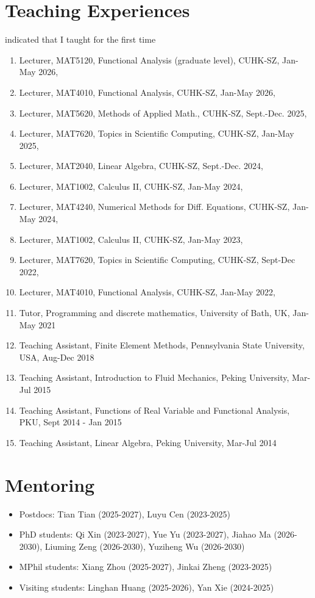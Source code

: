 \documentclass[letterpaper]{article}
\begin{document}
\section*{Teaching Experiences}
\hfill {\bf *} indicated that I taught for the first time
\begin{enumerate}[leftmargin=*]
\item {\bf *} Lecturer, MAT5120, Functional Analysis (graduate level),  CUHK-SZ, Jan-May 2026, 
\item Lecturer, MAT4010, Functional Analysis,  CUHK-SZ, Jan-May 2026, 
\item {\bf *} Lecturer, MAT5620, Methods of Applied Math., CUHK-SZ, Sept.-Dec. 2025,
\item  Lecturer, MAT7620, Topics in Scientific Computing, CUHK-SZ,  Jan-May 2025,
\item {\bf *} Lecturer, MAT2040, Linear Algebra, CUHK-SZ, Sept.-Dec. 2024,
\item Lecturer, MAT1002, Calculus II, CUHK-SZ, Jan-May 2024,
\item {\bf *} Lecturer, MAT4240, Numerical Methods for Diff. Equations, CUHK-SZ, Jan-May 2024,
\item {\bf *}  Lecturer, MAT1002, Calculus II, CUHK-SZ, Jan-May 2023, 

\item {\bf *} Lecturer, MAT7620, Topics in Scientific Computing,   CUHK-SZ, Sept-Dec 2022, 
\item {\bf *} Lecturer, MAT4010, Functional Analysis,  CUHK-SZ, Jan-May 2022, 
 
\item Tutor, Programming and discrete mathematics, University of Bath, UK, Jan-May 2021  
\item Teaching Assistant, Finite Element Methods, Pennsylvania State University, USA, Aug-Dec 2018
\item Teaching Assistant, Introduction to Fluid Mechanics, Peking University, Mar-Jul 2015
\item Teaching Assistant, Functions of Real Variable and Functional Analysis, PKU, Sept 2014 - Jan 2015
\item Teaching Assistant, Linear Algebra, Peking University, Mar-Jul 2014
\end{enumerate}



\section*{Mentoring}
\begin{itemize}[leftmargin=*]
\item Postdocs: Tian Tian (2025-2027), Luyu Cen (2023-2025)
\item PhD students: Qi Xin (2023-2027), Yue Yu (2023-2027), Jiahao Ma (2026-2030), Liuming Zeng (2026-2030), Yuziheng Wu (2026-2030)
\item MPhil students: Xiang Zhou (2025-2027), Jinkai Zheng (2023-2025)  
\item Visiting students: Linghan Huang (2025-2026), Yan Xie (2024-2025)
\end{itemize}
\end{document}
